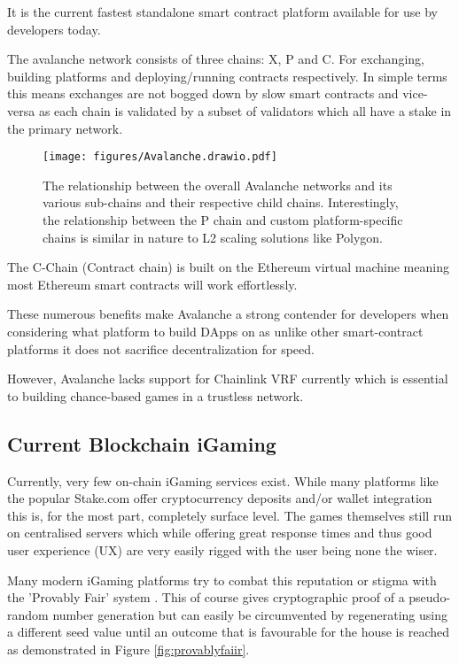 \documentclass[10pt,journal,compsoc]{IEEEtran}
\begin{document}
It is the current fastest standalone smart contract platform available for use by developers today. 

The avalanche network consists of three chains: X, P and C. For exchanging, building platforms and deploying/running contracts respectively. In simple terms this means exchanges are not bogged down by slow smart contracts and vice-versa as each chain is validated by a subset of validators which all have a stake in the primary network. 

\begin{figure}[!h]
    \centering
    \texttt{[image: figures/Avalanche.drawio.pdf]}
    \caption{The relationship between the overall Avalanche networks and its various sub-chains and their respective child chains. Interestingly, the relationship between the P chain and custom platform-specific chains is similar in nature to L2 scaling solutions like Polygon.}
    \label{fig:avalanche}
\end{figure}

The C-Chain (Contract chain) is built on the Ethereum virtual machine meaning most Ethereum smart contracts will work effortlessly. 

These numerous benefits make Avalanche a strong contender for developers when considering what platform to build DApps on as unlike other smart-contract platforms it does not sacrifice decentralization for speed.

However, Avalanche lacks support for Chainlink VRF currently which is essential to building chance-based games in a trustless network.

\subsection{Current Blockchain iGaming}
Currently, very few on-chain iGaming services exist. While many platforms like the popular Stake.com \cite{stake.com} offer cryptocurrency deposits and/or wallet integration this is, for the most part, completely surface level. The games themselves still run on centralised servers which while offering great response times and thus good user experience (UX) are very easily rigged with the user being none the wiser.

Many modern iGaming platforms try to combat this reputation or stigma with the 'Provably Fair' system \cite{poduszlo2017introduction}. This of course gives cryptographic proof of a pseudo-random number generation but can easily be circumvented by regenerating using a different seed value until an outcome that is favourable for the house is reached as demonstrated in Figure \ref{fig:provablyfaiir}.
\end{document}
